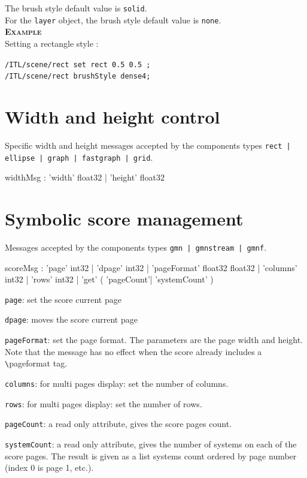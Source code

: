 \documentclass[a4paper,twoside]{report}
\newcommand{\sublevel}[1]	{\section{#1}}
\newcommand{\OSC}[1]		{\texttt{#1}}
\newcommand{\example}		{\textbf{\hspace{-1.5cm}\textbf{\textsc{Example }}}}
\let\olditemize\itemize
\let\oldenditemize\enditemize
\renewenvironment{itemize} 	{\olditemize \setlength{\itemsep}{1mm}}{\oldenditemize}
\newcommand{\sample}	[1]			{\vspace{-2mm}\begin{center}\colorbox{mygrey}{
								\begin{minipage}[t]{0.9\columnwidth} 
								{\small \texttt{#1}}
								\end{minipage}}\end{center}}
\begin{document}
The brush style default value is \OSC{solid}.\\
For the \OSC{layer} object, the brush style default value is \OSC{none}.\\

\example \\
Setting a rectangle style :
\sample{/ITL/scene/rect set rect 0.5 0.5 ;\\
/ITL/scene/rect brushStyle dense4; 
}


\sublevel{Width and height control}

Specific width and height messages accepted by the components types \OSC{rect | ellipse | graph | fastgraph | grid}.

\begin{rail}
widthMsg :  'width' float32
			| 'height' float32
\end{rail}



\sublevel{Symbolic score management}
\label{gmnpage}

Messages accepted by the components types \OSC{gmn | gmnstream | gmnf}. 
\begin{rail}
scoreMsg :      'page' int32
			| 'dpage' int32
			| 'pageFormat' float32 float32
			| 'columns' int32
			| 'rows' int32
			| 'get' ( 'pageCount'| 'systemCount' )
\end{rail}


\begin{itemize}
\item \OSC{page}: set the score current page
\item \OSC{dpage}: moves the score current page
\item \OSC{pageFormat}: set the page format. The parameters are the page width and height. Note that the message has no effect when the score already includes a \verb+\+pageformat tag.
\item \OSC{columns}: for multi pages display: set the number of columns.
\item \OSC{rows}: for multi pages display: set the number of rows.
\item \OSC{pageCount}:  a read only attribute, gives the score pages count.
\item \OSC{systemCount}:  a read only attribute, gives the number of systems on each of the score pages. The result is given as a list systems count ordered by page number (index 0 is page 1, etc.).
\end{itemize}
\end{document}
